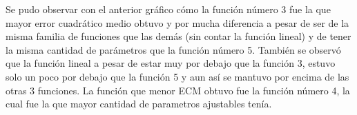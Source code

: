 Se pudo observar con el anterior gráfico cómo la función número 3 fue la que mayor error cuadrático medio obtuvo y por mucha diferencia a pesar de ser de la misma familia de funciones que las demás (sin contar la función lineal) y de tener la misma cantidad de parámetros que la función número 5. También se observó que la función lineal a pesar de estar muy por debajo que la función 3, estuvo solo un poco por debajo que la función 5 y aun así se mantuvo por encima de las otras 3 funciones.
La función que menor ECM obtuvo fue la función número 4, la cual fue la que mayor cantidad de parametros ajustables tenía.